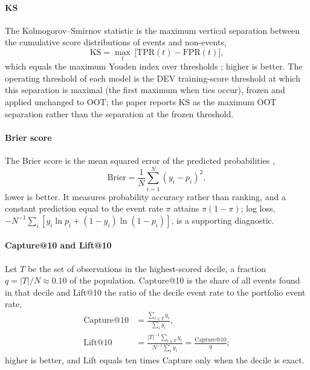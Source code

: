 \documentclass[final,5p,twocolumn]{elsarticle}
\newcommand{\KS}{\mathrm{KS}}
\newcommand{\TPR}{\mathrm{TPR}}
\newcommand{\FPR}{\mathrm{FPR}}
\begin{document}
\paragraph{KS}
The Kolmogorov--Smirnov statistic is the maximum vertical separation between the cumulative score distributions of events and non-events,
\begin{equation}
    \KS=\max_{t}\,\big[\TPR(t)-\FPR(t)\big],
    \label{eq:ks}
\end{equation}
which equals the maximum Youden index over thresholds \cite{youden1950}; higher is better. The operating threshold of each model is the DEV training-score threshold at which this separation is maximal (the first maximum when ties occur), frozen and applied unchanged to OOT; the paper reports KS as the maximum OOT separation rather than the separation at the frozen threshold.

\paragraph{Brier score}
The Brier score is the mean squared error of the predicted probabilities \cite{brier1950},
\begin{equation}
    \mathrm{Brier}=\frac{1}{N}\sum_{i=1}^{N}(y_i-p_i)^2 ,
    \label{eq:brier}
\end{equation}
lower is better. It measures probability accuracy rather than ranking, and a constant prediction equal to the event rate $\pi$ attains $\pi(1-\pi)$; log loss, $-N^{-1}\sum_i[y_i\ln p_i+(1-y_i)\ln(1-p_i)]$, is a supporting diagnostic.

\paragraph{Capture@10 and Lift@10}
Let $T$ be the set of observations in the highest-scored decile, a fraction $q=|T|/N\approx0.10$ of the population. Capture@10 is the share of all events found in that decile and Lift@10 the ratio of the decile event rate to the portfolio event rate,
\begin{equation}
\begin{aligned}
    \mathrm{Capture@10}&=\frac{\sum_{i\in T}y_i}{\sum_{i}y_i},\\
    \mathrm{Lift@10}&=\frac{|T|^{-1}\sum_{i\in T}y_i}{N^{-1}\sum_{i}y_i}=\frac{\mathrm{Capture@10}}{q};
\end{aligned}
    \label{eq:capture10}
\end{equation}
higher is better, and Lift equals ten times Capture only when the decile is exact.
\end{document}
